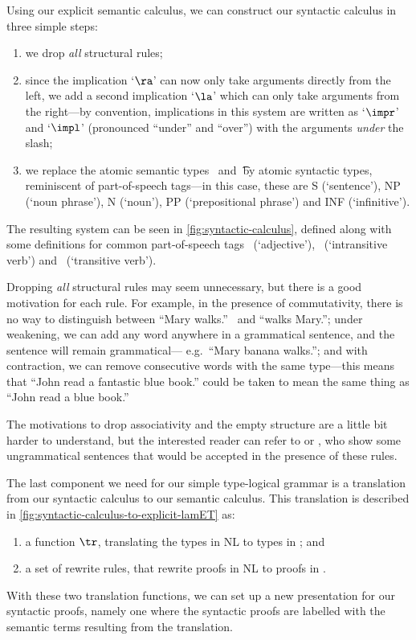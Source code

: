 Using our explicit semantic calculus, we can construct our syntactic
calculus in three simple steps:
\begin{enumerate}
\item%
  we drop \emph{all} structural rules;
\item%
  since the implication `$\ra$' can now only take arguments directly
  from the left, we add a second implication `$\la$' which can only
  take arguments from the right---by convention, implications in this
  system are written as `$\impr$' and `$\impl$' (pronounced ``under''
  and ``over'') with the arguments \emph{under} the slash;
\item%
  we replace the atomic semantic types \e\ and \t\ by atomic syntactic
  types, reminiscent of part-of-speech tags---in this case, these
  are S (`sentence'), NP (`noun phrase'), N (`noun'), PP
  (`prepositional phrase') and INF (`infinitive').
\end{enumerate}
The resulting system can be seen in \autoref{fig:syntactic-calculus},
defined along with some definitions for common part-of-speech tags \A\
(`adjective'), \IV\ (`intransitive verb') and \TV\ (`transitive verb').



Dropping \emph{all} structural rules may seem unnecessary, but there
is a good motivation for each rule.  For example, in the presence of
commutativity, there is no way to distinguish between ``Mary walks.''\ %
and ``walks Mary.''; under weakening, we can add any word anywhere in a
grammatical sentence, and the sentence will remain grammatical---
e.g.\ ``Mary banana walks.''; and with contraction, we can remove
consecutive words with the same type---this means that ``John read
a fantastic blue book.'' could be taken to mean the same thing as
``John read a blue book.''

The motivations to drop associativity and the empty structure are a
little bit harder to understand, but the interested reader can refer
to \citet[p. 33, 105-106]{moot2012} or \citet{lambek1961}, who show
some ungrammatical sentences that would be accepted in the presence of
these rules.

\vspace*{1\baselineskip}

The last component we need for our simple type-logical grammar is a
translation from our syntactic calculus to our semantic calculus. This
translation is described in
\autoref{fig:syntactic-calculus-to-explicit-lamET} as:
\begin{enumerate}[label=(\arabic*)]
\item
  a function $\tr$, translating the types in NL to types in \lamET; and
\item
  a set of rewrite rules, that rewrite proofs in NL to proofs in \lamET.
\end{enumerate}
With these two translation functions, we can set up a new presentation
for our syntactic proofs, namely one where the syntactic proofs are
labelled with the semantic terms resulting from the translation.

